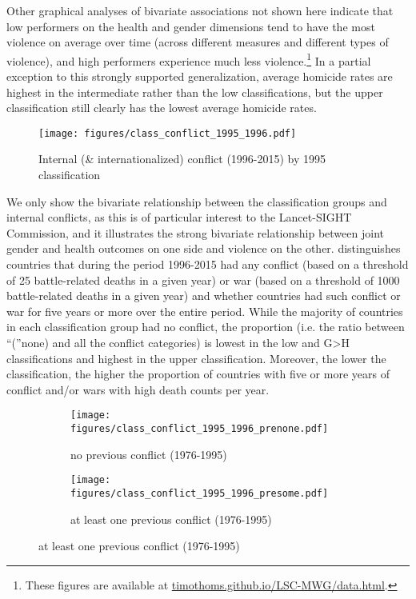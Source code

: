 \documentclass[12pt]{article}
\begin{document}
Other graphical analyses of bivariate associations not shown here indicate that low performers on the health and gender dimensions tend to have the most violence on average over time (across different measures and different types of violence), and high performers experience much less violence.\footnote{
These figures are available at \href{https://timothoms.github.io/LSC-MWG/}{timothoms.github.io/LSC-MWG/data.html}.}
In a partial exception to this strongly supported generalization, average homicide rates are highest in the intermediate rather than the low classifications, but the upper classification still clearly has the lowest average homicide rates.

\begin{figure}[htb]
    \centering
    \caption{Internal (\& internationalized) conflict (1996-2015) by 1995 classification}
    \label{class1995conflict}
    \texttt{[image: figures/class\_conflict\_1995\_1996.pdf]}
\end{figure}

We only show the bivariate relationship between the classification groups and internal conflicts, as this is of particular interest to the Lancet-SIGHT Commission, and it illustrates the strong bivariate relationship between joint gender and health outcomes on one side and violence on the other.
 distinguishes countries that during the period 1996-2015 had any conflict (based on a threshold of 25 battle-related deaths in a given year) or war (based on a threshold of 1000 battle-related deaths in a given year) and whether countries had such conflict or war for five years or more over the entire period.
While the majority of countries in each classification group had no conflict, the proportion (i.e. the ratio between \enquote(none) and all the conflict categories) is lowest in the low and G>H classifications and highest in the upper classification. Moreover, the lower the classification, the higher the proportion of countries with five or more years of conflict and/or wars with high death counts per year.

\begin{figure}[htbp]
    \centering
    \caption{Internal (\& internationalized) conflict (1996-2015) by 1995 classification}
    \label{class1995conflict_pre}
    \begin{subfigure}[b]{\textwidth}
      \caption{no previous conflict (1976-1995)}
      \texttt{[image: figures/class\_conflict\_1995\_1996\_prenone.pdf]}
    \end{subfigure}
    \begin{subfigure}[b]{\textwidth}
      \caption{at least one previous conflict (1976-1995)}
      \texttt{[image: figures/class\_conflict\_1995\_1996\_presome.pdf]}
    \end{subfigure}
\end{figure}
\end{document}
